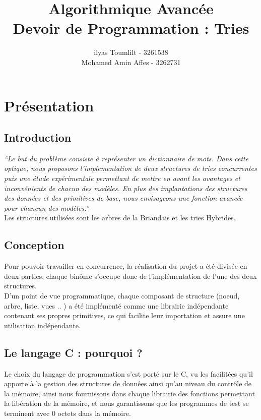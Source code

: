 \documentclass[a4paper,8pt]{report}
\title{{\LARGE Algorithmique Avanc\'ee \\ Devoir de Programmation : Tries}}
\author{ilyas Toumlilt - 3261538\\Mohamed Amin Affes - 3262731}
\begin{document}
\maketitle
\renewcommand{\contentsname}{Sommaire}
\tableofcontents

\chapter{Pr\'esentation}

\section*{Introduction}\label{sec:name}
\textit{``Le but du probl\`eme consiste \`a repr\'esenter un dictionnaire de mots. Dans cette optique, nous proposons l'implementation de deux structures de tries concurrentes puis une \'etude exp\'erimentale permettant de mettre en avant les avantages et inconv\'enients de chacun des mod\`eles. En plus des implantations des structures des donn\'ees et des primitives de base, nous envisageons une fonction avanc\'ee pour chancun des mod\`eles.''}\\
Les structures utilisées sont les arbres de la Briandais et les tries Hybrides.

\section*{Conception}\label{sec:name}
Pour pouvoir travailler en concurrence, la réalisation du projet a été divisée en deux parties, chaque binôme s'occupe donc de l'implémentation de l'une des deux structures.\\
D'un point de vue programmatique, chaque composant de structure (noeud, arbre, liste, vues .. ) a été implémenté comme une librairie indépendante contenant ses propres primitives, ce qui facilite leur importation et assure une utilisation indépendante.\\

\section*{Le langage C : pourquoi ?}\label{sec:name}
Le choix du langage de programmation s'est porté sur le C, vu les facilitées qu'il apporte à la gestion des structures de données ainsi qu'au niveau du contrôle de la mémoire, ainsi nous fournissons dans chaque librairie des fonctions permettant la libération de la mémoire, et nous garantissons que les programmes de test se terminent avec 0 octets dans la mémoire.
\end{document}
